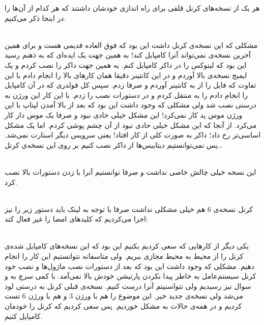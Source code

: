 هر یک از نسخه‌های کرنل قلقی برای راه اندازی خودشان داشتند که هر کدام از آن‌ها را در اینجا
ذکر می‌کنیم.

\\\noindent
مشکلی که این نسخه‌ی کرنل داشت این بود که فوق العاده قدیمی هست و برای همین آخرین نسخه‌ی
نمی‌تواند آنرا کامپایل کند! به همین جهت یک ایده‌ای که به ذهنم رسید این بود که لینوکس را در داکر
کامپایل کنم. به همین جهت داکر را نصب کردم و یک ایمیج نسخه‌ی
بالا آوردم و در این کانتینر دقیقا همان کار‌های بالا را انجام دادم با این تفاوت که فایل
را از
به کانتینر آوردم و صرفا
زدم. سپس کل فولدری که در آن کامپایل را انجام دادم را به
منتقل کردم و در
دستورات نصب را زدم. با این کار این ورژن به درستی نصب شد ولی مشکلی که وجود داشت این بود که
بعد از بالا آمدن لپتاپ با این ورژن موس پد کار نمی‌کرد! این مشکل خیلی حادی نبود و صرفا یک موس
دار کار می‌کرد. از آنجا که این مشکل خیلی حادی نبود از آن چشم پوشی کردم. اما یک مشکل اساسی‌تر رخ داد؛
داکر به صورت کلی از کار افتاد! یعنی سرویس
دیگر استارت نمی‌شد. پس نمی‌توانستیم دیتابیس‌ها از داکر نصب کنیم بر روی این نسخه‌ی کرنل\dots

\\\noindent
این نسخه خیلی چالش خاصی نداشت و صرفا توانستیم آنرا با زدن دستورات بالا نصب کرد.

\\\noindent
کرنل نسخه‌ی 6 هم خیلی مشکلی نداشت صرفا با توجه به
لینک باید دستور زیر را نیز اجرا می‌کردیم که کلید‌های امضا را غیر فعال کند:

\\\noindent
یکی دیگر از کار‌هایی که سعی کردیم بکنیم این بود که این نسخه‌های کامپایل شده‌ی کرنل را از محیط
به محیط مجازی ببریم. ولی متاسفانه نتوانستیم این کار را انجام دهیم. مشکلی که وجود داشت این بود که بعد از
دستورات نصب ماژول‌ها و نصب خود کرنل سیستم‌عامل به خاطر پیدا نکردن پارتیشن خودش بالا نمی‌آمد. با کمی سرچ به
و
سوال نیز رسیدیم ولی نتواسنیتم آنرا درست کنیم. نسخه‌ی قبلی کرنل به درستی لود می‌شد ولی نسخه‌ی جدید خیر.
این موضوع را هم با ورژن 3 و هم با ورژن 6 تست کردیم و در همه‌ی حالات به مشکل خوردیم. پس سعی کردیم که کرنل
را خودمان کامپایل کنیم.


